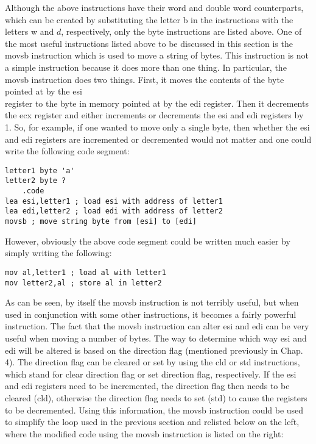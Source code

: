 \documentclass[10pt]{article}
\begin{document}
Although the above instructions have their word and double word counterparts, which can be created by substituting the letter b in the instructions with the letters w and $d$, respectively, only the byte instructions are listed above. One of the most useful instructions listed above to be discussed in this section is the movsb instruction which is used to move a string of bytes. This instruction is not a simple instruction because it does more than one thing. In particular, the movsb instruction does two things. First, it moves the contents of the byte pointed at by the esi\\
register to the byte in memory pointed at by the edi register. Then it decrements the ecx register and either increments or decrements the esi and edi registers by 1. So, for example, if one wanted to move only a single byte, then whether the esi and edi registers are incremented or decremented would not matter and one could write the following code segment:

\begin{verbatim}
letter1 byte 'a'
letter2 byte ?
    .code
lea esi,letter1 ; load esi with address of letter1
lea edi,letter2 ; load edi with address of letter2
movsb ; move string byte from [esi] to [edi]
\end{verbatim}

However, obviously the above code segment could be written much easier by simply writing the following:

\begin{verbatim}
mov al,letter1 ; load al with letter1
mov letter2,al ; store al in letter2
\end{verbatim}

As can be seen, by itself the movsb instruction is not terribly useful, but when used in conjunction with some other instructions, it becomes a fairly powerful instruction. The fact that the movsb instruction can alter esi and edi can be very useful when moving a number of bytes. The way to determine which way esi and edi will be altered is based on the direction flag (mentioned previously in Chap. 4). The direction flag can be cleared or set by using the cld or std instructions, which stand for clear direction flag or set direction flag, respectively. If the esi and edi registers need to be incremented, the direction flag then needs to be cleared (cld), otherwise the direction flag needs to set (std) to cause the registers to be decremented. Using this information, the movsb instruction could be used to simplify the loop used in the previous section and relisted below on the left, where the modified code using the movsb instruction is listed on the right:
\end{document}
